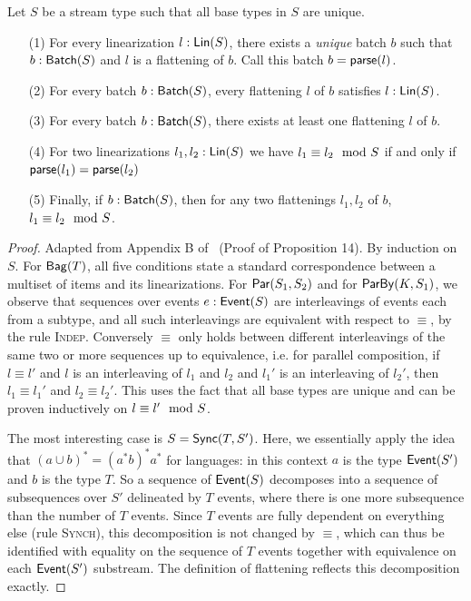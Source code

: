 \begin{proposition}
\label{prop:batch-lin-correspondence}
Let $S$ be a stream type such that all base types in $S$ are unique.
\begin{enumerate}
\item[(1)] For every linearization $l: \mathsf{Lin}({S})$, there exists a \emph{unique} batch $b$ such that $b: \mathsf{Batch}({S})$ and $l$ is a flattening of $b$. Call this batch $b = \mathsf{parse}(l)$.
\item[(2)] For every batch $b: \mathsf{Batch}({S})$, every flattening $l$ of $b$ satisfies $l: \mathsf{Lin}({S})$.
\item[(3)] For every batch $b: \mathsf{Batch}({S})$, there exists at least one flattening $l$ of $b$.
\item[(4)] For two linearizations $l_1, l_2: \mathsf{Lin}({S})$ we have $l_1 \equiv l_2 \mod {S}$ if and only if $\mathsf{parse}(l_1) = \mathsf{parse}(l_2)$
\item[(5)] Finally, if $b: \mathsf{Batch}({S})$, then for any two flattenings $l_1, l_2$ of $b$, $l_1 \equiv l_2 \mod {S}$.
\end{enumerate}
\end{proposition}
\begin{proof}
Adapted from Appendix B of~ (Proof of Proposition 14).
By induction on $S$.
For $\mathsf{Bag}({T})$,
all five conditions state a standard correspondence between a multiset of items and its linearizations.
For $\mathsf{Par}({S_1}, {S_2})$
and for $\mathsf{ParBy}({K}, S_1)$,
we observe that sequences over events $e: \mathsf{Event}({S})$ are interleavings of events each from a subtype,
and all such interleavings are equivalent with respect to $\equiv$, by the rule \textsc{Indep}.
Conversely $\equiv$ only holds between different interleavings of the same two or more sequences up to equivalence, i.e. for parallel composition, if $l \equiv l'$ and $l$ is an interleaving of $l_1$ and $l_2$ and $l_1'$ is an interleaving of $l_2'$, then $l_1 \equiv l_1'$ and $l_2 \equiv l_2'$.
This uses the fact that all base types are unique and can be proven inductively on $l \equiv l' \mod {S}$.

The most interesting case is $S = \mathsf{Sync}({T}, S')$.
Here, we essentially apply the idea that $(a \cup b)^{*} = (a^{*} b)^{*} a^{*}$ for languages: in this context $a$ is the type $\mathsf{Event}(S')$ and $b$ is the type $T$.
So a sequence of $\mathsf{Event}(S)$ decomposes into a sequence of subsequences over $S'$ delineated by $T$ events, where there is one more subsequence than the number of $T$ events.
Since $T$ events are fully dependent on everything else (rule \textsc{Synch}), this decomposition is not changed by $\equiv$, which can thus be identified with equality on the sequence of $T$ events together with equivalence on each $\mathsf{Event}(S')$ substream.
The definition of flattening reflects this decomposition exactly.
\end{proof}

